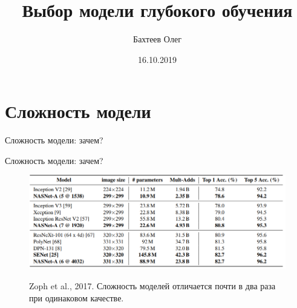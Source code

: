 \documentclass[usenames,dvipsnames,10pt,pdf,utf8,russian,aspectratio=43]{beamer}
\title[Выбор модели]{Выбор модели глубокого обучения}
\author{Бахтеев Олег}
\institute{МФТИ}
\date{16.10.2019}
\begin{document}
\begin{frame}
  \titlepage
\end{frame}


\section{Сложность модели}
\begin{frame}{Сложность модели: зачем?}
\begin{figure}
  \centering
\label{fig:1}\qquad

\end{figure}


\end{frame}

\begin{frame}{Сложность модели: зачем?}

\begin{figure}
  \centering
 {\includegraphics[width=\textwidth]{zoph.png}}
\label{fig:1}\qquad
\caption*{Zoph et al., 2017.  Сложность моделей отличается почти в два раза при одинаковом качестве.}
\end{figure}
\end{frame}
\end{document}
